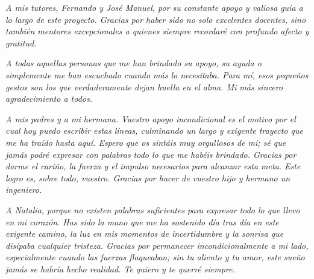 \documentclass[a4paper, 12pt]{article}
\begin{document}
\clearpage

\thispagestyle{empty}
\vspace*{4cm}
\begin{flushright}

\textit{A mis tutores, Fernando y José Manuel, por su constante apoyo y valiosa guía a lo largo de este proyecto. Gracias por haber sido no solo excelentes docentes, sino también mentores excepcionales a quienes siempre recordaré con profundo afecto y gratitud.}

\vspace{1cm}

\textit{A todas aquellas personas que me han brindado su apoyo, su ayuda o simplemente me han escuchado cuando más lo necesitaba. Para mí, esos pequeños gestos son los que verdaderamente dejan huella en el alma. Mi más sincero agradecimiento a todos.}
\end{flushright}
\clearpage

\thispagestyle{empty}
\vspace*{6cm}
\begin{flushright}
\textit{A mis padres y a mi hermana. Vuestro apoyo incondicional es el motivo por el cual hoy puedo escribir estas líneas, culminando un largo y exigente trayecto que me ha traído hasta aquí. Espero que os sintáis muy orgullosos de mí; sé que jamás podré expresar con palabras todo lo que me habéis brindado. Gracias por darme el cariño, la fuerza y el impulso necesarios para alcanzar esta meta. Este logro es, sobre todo, vuestro. Gracias por hacer de vuestro hijo y hermano un ingeniero.}

\vspace{1cm}

\textit{A Natalia, porque no existen palabras suficientes para expresar todo lo que llevo en mi corazón. Has sido la mano que me ha sostenido día tras día en este exigente camino, la luz en mis momentos de incertidumbre y la sonrisa que disipaba cualquier tristeza. Gracias por permanecer incondicionalmente a mi lado, especialmente cuando las fuerzas flaqueaban; sin tu aliento y tu amor, este sueño jamás se habría hecho realidad. Te quiero y te querré siempre.}
\end{flushright}
\clearpage




\thispagestyle{empty}
\end{document}
